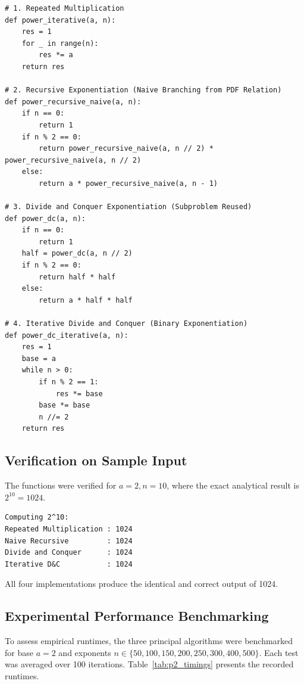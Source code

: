 \documentclass[12pt]{article}
\begin{document}
\begin{lstlisting}[style=code, caption={Problem 2 Exponentiation Implementations}]
# 1. Repeated Multiplication
def power_iterative(a, n):
    res = 1
    for _ in range(n):
        res *= a
    return res

# 2. Recursive Exponentiation (Naive Branching from PDF Relation)
def power_recursive_naive(a, n):
    if n == 0:
        return 1
    if n % 2 == 0:
        return power_recursive_naive(a, n // 2) * power_recursive_naive(a, n // 2)
    else:
        return a * power_recursive_naive(a, n - 1)

# 3. Divide and Conquer Exponentiation (Subproblem Reused)
def power_dc(a, n):
    if n == 0:
        return 1
    half = power_dc(a, n // 2)
    if n % 2 == 0:
        return half * half
    else:
        return a * half * half

# 4. Iterative Divide and Conquer (Binary Exponentiation)
def power_dc_iterative(a, n):
    res = 1
    base = a
    while n > 0:
        if n % 2 == 1:
            res *= base
        base *= base
        n //= 2
    return res
\end{lstlisting}

\subsection{Verification on Sample Input}
The functions were verified for $a = 2, n = 10$, where the exact analytical result is $2^{10} = 1024$.

\begin{lstlisting}[style=output, caption={Console Output for Exponentiation Verification}]
Computing 2^10:
Repeated Multiplication : 1024
Naive Recursive         : 1024
Divide and Conquer      : 1024
Iterative D&C           : 1024
\end{lstlisting}

All four implementations produce the identical and correct output of 1024.

\subsection{Experimental Performance Benchmarking}
To assess empirical runtimes, the three principal algorithms were benchmarked for base $a = 2$ and exponents $n \in \{50, 100, 150, 200, 250, 300, 400, 500\}$. Each test was averaged over 100 iterations. Table~\ref{tab:p2_timings} presents the recorded runtimes.
\end{document}
